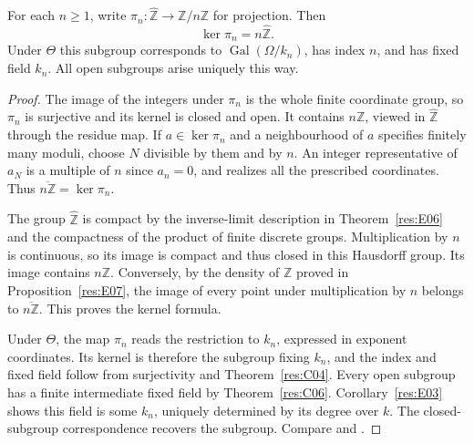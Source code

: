 \begin{theorem}
\label{res:E08}
For each \(n\geq1\), write \(\pi_n:\widehat{\mathbb Z}\to
\mathbb Z/n\mathbb Z\) for projection. Then
\[
                   \ker\pi_n=n\widehat{\mathbb Z}.
\]
Under \(\Theta\) this subgroup corresponds to
\(\operatorname{Gal}(\Omega/k_n)\), has index \(n\), and has
fixed field \(k_n\). All open subgroups arise uniquely this way.
\end{theorem}
\begin{proof}
The image of the integers under \(\pi_n\) is the whole finite
coordinate group, so \(\pi_n\) is surjective and its kernel is
closed and open. It contains \(n\mathbb Z\), viewed in
\(\widehat{\mathbb Z}\) through the residue map. If \(a\in\ker\pi_n\)
and a neighbourhood of \(a\) specifies finitely many moduli,
choose \(N\) divisible by them and by \(n\). An integer
representative of \(a_N\) is a multiple of \(n\) since \(a_n=0\),
and realizes all the prescribed coordinates. Thus
\(\overline{n\mathbb Z}=\ker\pi_n\).

The group \(\widehat{\mathbb Z}\) is compact by the inverse-limit
description in Theorem~\ref{res:E06} and the compactness of
the product of finite discrete groups. Multiplication by \(n\)
is continuous, so its image is compact and thus closed in this
Hausdorff group. Its image contains \(n\mathbb Z\). Conversely, by
the density of \(\mathbb Z\) proved in Proposition~\ref{res:E07},
the image of every point under multiplication by \(n\) belongs
to \(\overline{n\mathbb Z}\). This proves the kernel formula.

Under \(\Theta\), the map \(\pi_n\) reads the restriction to
\(k_n\), expressed in exponent coordinates. Its kernel is
therefore the subgroup fixing \(k_n\), and the index and fixed
field follow from surjectivity and Theorem~\ref{res:C04}.
Every open subgroup has a finite intermediate fixed field by
Theorem~\ref{res:C06}. Corollary~\ref{res:E03} shows this
field is some \(k_n\), uniquely determined by its degree over \(k\).
The closed-subgroup correspondence recovers the subgroup.
Compare \cite[Theorem 7.13(b) and Example 7.17]{milne}
and \cite[Theorem 2.7.2]{rz}.
\end{proof}

